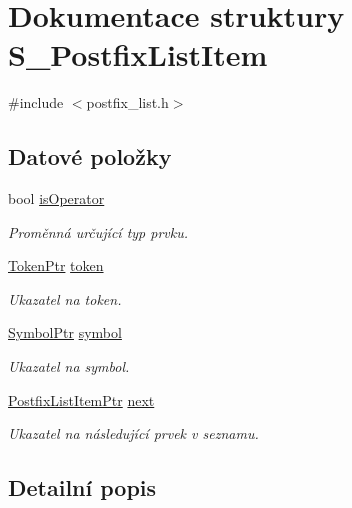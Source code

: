 \hypertarget{struct_s___postfix_list_item}{}\section{Dokumentace struktury S\+\_\+\+Postfix\+List\+Item}
\label{struct_s___postfix_list_item}


{\ttfamily \#include $<$postfix\+\_\+list.\+h$>$}

\subsection*{Datové položky}
\begin{DoxyCompactItemize}
\item 
bool \hyperlink{struct_s___postfix_list_item_a4dc881eaac3e93ea4d9e27f5e551401e}{is\+Operator}
\begin{DoxyCompactList}\small\item\em Proměnná určující typ prvku. \end{DoxyCompactList}\item 
\hyperlink{token_8h_aa80161bf9be61c651bc95eafc643d9a5}{Token\+Ptr} \hyperlink{struct_s___postfix_list_item_a15041877995067114b025a8d4de79e05}{token}
\begin{DoxyCompactList}\small\item\em Ukazatel na token. \end{DoxyCompactList}\item 
\hyperlink{symtable_8h_ae75ae77f6060003cdcf7bd31d2c972f2}{Symbol\+Ptr} \hyperlink{struct_s___postfix_list_item_a6c83d4e8bedc21d04db7485eda709630}{symbol}
\begin{DoxyCompactList}\small\item\em Ukazatel na symbol. \end{DoxyCompactList}\item 
\hyperlink{postfix__list_8h_a8feb56873a59e2796c49dce10bc3d21c}{Postfix\+List\+Item\+Ptr} \hyperlink{struct_s___postfix_list_item_ac57b059aa3e185ab3e15838c28e0c5f7}{next}
\begin{DoxyCompactList}\small\item\em Ukazatel na následující prvek v seznamu. \end{DoxyCompactList}\end{DoxyCompactItemize}


\subsection{Detailní popis}


